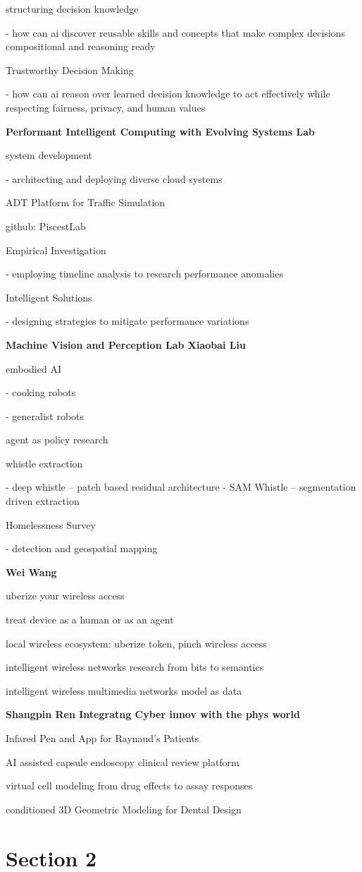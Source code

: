 \documentclass{article}
\begin{document}
structuring decision knowledge

- how can ai discover reusable skills and concepts that make complex decisions compositional and reasoning ready


Trustworthy Decision Making

- how can ai reason over learned decision knowledge to act effectively while respecting fairness, privacy, and human values






\textbf{\Large Performant Intelligent Computing with Evolving Systems Lab}

system development

- architecting and deploying diverse cloud systems

ADT Platform for Traffic Simulation

github: PiscestLab

Empirical Investigation

- employing timeline analysis to research performance anomalies

Intelligent Solutions

- designing strategies to mitigate performance variations




\textbf{\Large Machine Vision and Perception Lab Xiaobai Liu}

embodied AI

- cooking robots

- generalist robots

agent as policy research

whistle extraction

- deep whistle
-- patch based residual architecture
- SAM Whistle
-- segmentation driven extraction

Homelessness Survey

- detection and geospatial mapping




\textbf{\Large Wei Wang}

uberize your wireless access

treat device as a human or as an agent

local wireless ecosystem: uberize token, pinch wireless access

intelligent wireless networks research from bits to semantics

intelligent wireless multimedia networks model as data



\textbf{\Large Shangpin Ren Integratng Cyber innov with the phys world}

Infared Pen and App for Raynaud's Patients

AI assisted capsule endoscopy clinical review platform

virtual cell modeling from drug effects to assay responses

conditioned 3D Geometric Modeling for Dental Design


\section{Section 2}
\end{document}
